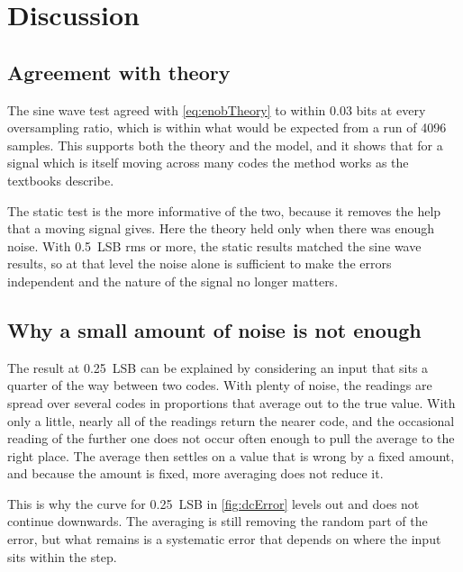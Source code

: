 
\section{Discussion}
\label{sec:discussion}

\subsection{Agreement with theory}

The sine wave test agreed with \cref{eq:enobTheory} to within 0.03 bits at
every oversampling ratio, which is within what would be expected from a run
of 4096 samples. This supports both the theory and the model, and it shows
that for a signal which is itself moving across many codes the method works
as the textbooks describe.

The static test is the more informative of the two, because it removes the
help that a moving signal gives. Here the theory held only when there was
enough noise. With \qty{0.5}{LSB} rms or more, the static results matched the
sine wave results, so at that level the noise alone is sufficient to make the
errors independent and the nature of the signal no longer matters.

\subsection{Why a small amount of noise is not enough}

The result at \qty{0.25}{LSB} can be explained by considering an input that
sits a quarter of the way between two codes. With plenty of noise, the
readings are spread over several codes in proportions that average out to the
true value. With only a little, nearly all of the readings return the nearer
code, and the occasional reading of the further one does not occur often
enough to pull the average to the right place. The average then settles on a
value that is wrong by a fixed amount, and because the amount is fixed, more
averaging does not reduce it.

This is why the curve for \qty{0.25}{LSB} in \cref{fig:dcError} levels out
and does not continue downwards. The averaging is still removing the random
part of the error, but what remains is a systematic error that depends on
where the input sits within the step.


